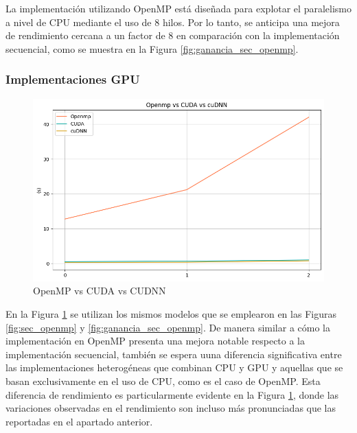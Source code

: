 La implementación utilizando OpenMP está diseñada para explotar el paralelismo a nivel de CPU mediante el uso de 8 hilos. Por lo tanto, se anticipa una mejora de rendimiento cercana a un factor de 8 en comparación con la implementación secuencial, como se muestra en la Figura \ref{fig:ganancia_sec_openmp}.

\vspace{10mm}

\subsubsection{Implementaciones GPU}

\begin{figure}[H]
	\centering
	\includegraphics[scale=0.52]{imagenes/openmp_cuda_cudnn.png}  
	\caption{OpenMP vs CUDA vs CUDNN}
	\label{fig:openmp_cuda_cudnn}
\end{figure}

\newpage

En la Figura \ref{fig:openmp_cuda_cudnn} se utilizan los mismos modelos que se emplearon en las Figuras \ref{fig:sec_openmp} y \ref{fig:ganancia_sec_openmp}.
De manera similar a cómo la implementación en OpenMP presenta una mejora notable respecto a la implementación secuencial, también se espera uuna diferencia significativa entre las implementaciones heterogéneas que combinan CPU y GPU  y aquellas que se basan exclusivamente en el uso de CPU, como es el caso de OpenMP. Esta diferencia de rendimiento es particularmente evidente en la Figura \ref{fig:openmp_cuda_cudnn}, donde las variaciones observadas en el rendimiento son incluso más pronunciadas que las reportadas en el apartado anterior.

